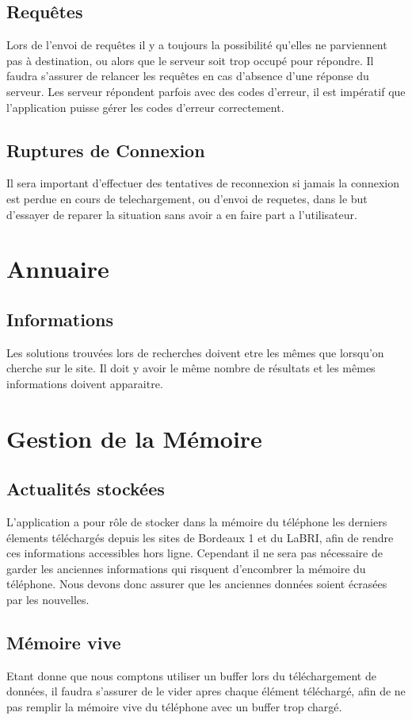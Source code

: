 \documentclass [pdftex,12pt] {report}
\begin{document}
    \subsection{Requêtes}
      Lors de l'envoi de requêtes il y a toujours la possibilité qu'elles ne parviennent pas à destination, ou alors que le serveur soit trop occupé pour répondre. Il faudra s'assurer de relancer les requêtes en cas d'absence d'une réponse du serveur. Les serveur répondent parfois avec des codes d'erreur, il est impératif que l'application puisse gérer les codes d'erreur correctement.

    \subsection{Ruptures de Connexion}
      Il sera important d'effectuer des tentatives de reconnexion si jamais la connexion est perdue en cours de telechargement, ou d'envoi de requetes, dans le but d'essayer de reparer la situation sans avoir a en faire part a l'utilisateur.

  \section{Annuaire}
    \subsection{Informations}
      Les solutions trouvées lors de recherches doivent etre les mêmes que lorsqu'on cherche sur le site. Il doit y avoir le même nombre de résultats et les mêmes informations doivent apparaitre.

  \section{Gestion de la Mémoire}
    \subsection{Actualités stockées}
      L'application a pour rôle de stocker dans la mémoire du téléphone les derniers élements téléchargés depuis les sites de Bordeaux 1  et du LaBRI, afin de rendre ces informations accessibles hors ligne. Cependant il ne sera pas nécessaire de garder les anciennes informations qui risquent d'encombrer la mémoire du téléphone. Nous devons donc assurer que les anciennes données soient écrasées par les nouvelles.

    \subsection{Mémoire vive}
      Etant donne que nous comptons utiliser un buffer lors du téléchargement de données, il faudra s'assurer de le vider apres chaque élément téléchargé, afin de ne pas remplir la mémoire vive du téléphone avec un buffer trop chargé.
\end{document}
